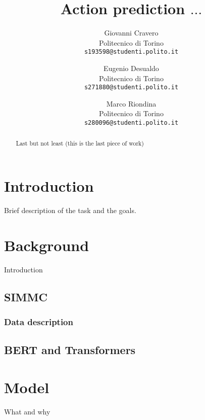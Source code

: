 \documentclass[final]{cvpr}
\begin{document}
	
	\title{Action prediction $\ldots$}
	
	\author{Giovanni Cravero\\
		Politecnico di Torino\\
		{\tt\small s193598@studenti.polito.it}
		\and
		Eugenio Desualdo\\
		Politecnico di Torino\\
		{\tt\small s271880@studenti.polito.it}
		\and
		Marco Riondina\\
		Politecnico di Torino\\
		{\tt\small s280096@studenti.polito.it}
	}
	
	\maketitle
	
	\begin{abstract}
		Last but not least (this is the last piece of work)
	\end{abstract}
	
	\section{Introduction}
	Brief description of the task and the goals.
	
	\section{Background}
	Introduction
	\subsection{SIMMC}
	
	\subsubsection{Data description}
	
	\subsection{BERT and Transformers}
	
	\section{Model}
	What and why
	
\end{document}
